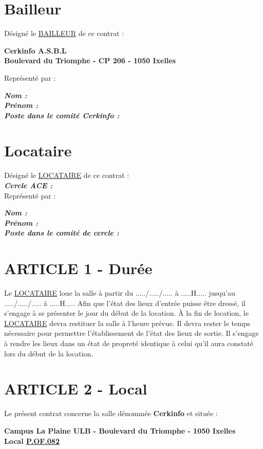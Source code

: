 \documentclass{article}
\begin{document}
\section*{Bailleur}
Désigné le \underline{BAILLEUR} de ce contrat :

\begin{center}
    \textbf{Cerkinfo A.S.B.L}\\
    \textbf{Boulevard du Triomphe - CP 206 - 1050 Ixelles}
\end{center}
Représenté par :

    \textbf{\textit{Nom :}}\\
    
    \textbf{\textit{Prénom :}}\\
    
    \textbf{\textit{Poste dans le comité Cerkinfo :}}

\section*{Locataire}
Désigné le \underline{LOCATAIRE} de ce contrat : \\

    \textbf{\textit{Cercle ACE :}}\\

Représenté par :

    \textbf{\textit{Nom :}}\\
    
    \textbf{\textit{Prénom :}}\\
    
    \textbf{\textit{Poste dans le comité de cercle :}}
    
\newpage

\section*{ARTICLE 1 - Durée}
Le \underline{LOCATAIRE} loue la salle à partir du ...../...../..... à .....H..... jusqu’au ...../...../..... à .....H..... 
Afin que l’état des lieux d’entrée puisse être dressé, il s’engage à se présenter le jour du début de la location. À la fin de location, le \underline{LOCATAIRE} devra restituer la salle à l’heure prévue. Il devra rester le temps nécessaire pour permettre l’établissement de l’état des lieux de sortie. Il s’engage à rendre les lieux dans un état de propreté identique à celui qu’il aura constaté lors du début de la location.

\section*{ARTICLE 2 - Local}
Le présent contrat concerne la salle dénommée \textbf{Cerkinfo} et située : 
\begin{center}
    \textbf{Campus La Plaine ULB - Boulevard du Triomphe - 1050 Ixelles}\\
    \textbf{Local \underline{P.OF.082}}
\end{center}
\end{document}
